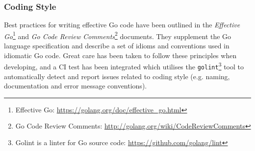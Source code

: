 
\subsubsection{Coding Style}

Best practices for writing effective Go code have been outlined in the \textit{Effective Go}\footnote{Effective Go: \url{https://golang.org/doc/effective_go.html}} and \textit{Go Code Review Comments}\footnote{Go Code Review Comments: \url{http://golang.org/wiki/CodeReviewComments}} documents. They supplement the Go language specification and describe a set of idioms and conventions used in idiomatic Go code. Great care has been taken to follow these principles when developing, and a CI test has been integrated which utilises the \texttt{golint}\footnote{Golint is a linter for Go source code: \url{https://github.com/golang/lint}} tool to automatically detect and report issues related to coding style (e.g. naming, documentation and error message conventions).
